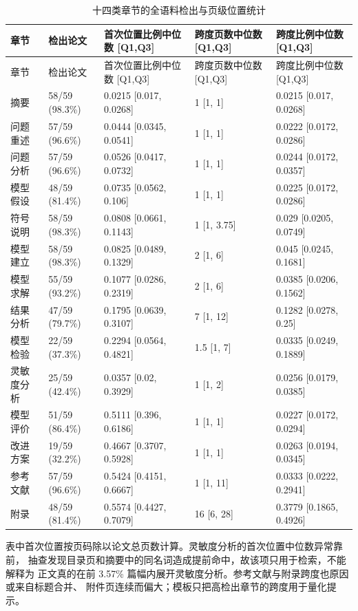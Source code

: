 \begin{longtable}{p{1.8cm}p{2.5cm}p{3.0cm}p{2.8cm}p{3.0cm}}
\caption{十四类章节的全语料检出与页级位置统计}\label{tab:section-stats}\\
\toprule
章节 & 检出论文 & 首次位置比例中位数 [Q1,Q3] & 跨度页数中位数 [Q1,Q3] & 跨度比例中位数 [Q1,Q3]\\
\midrule
\endfirsthead
\toprule
章节 & 检出论文 & 首次位置比例中位数 [Q1,Q3] & 跨度页数中位数 [Q1,Q3] & 跨度比例中位数 [Q1,Q3]\\
\midrule
\endhead
摘要 & 58/59 (98.3\%) & 0.0215 [0.017, 0.0268] & 1 [1, 1] & 0.0215 [0.017, 0.0268]\\
问题重述 & 57/59 (96.6\%) & 0.0444 [0.0345, 0.0541] & 1 [1, 1] & 0.0222 [0.0172, 0.0286]\\
问题分析 & 57/59 (96.6\%) & 0.0526 [0.0417, 0.0732] & 1 [1, 1] & 0.0244 [0.0172, 0.0357]\\
模型假设 & 48/59 (81.4\%) & 0.0735 [0.0562, 0.106] & 1 [1, 1] & 0.0225 [0.0172, 0.0286]\\
符号说明 & 58/59 (98.3\%) & 0.0808 [0.0661, 0.1143] & 1 [1, 3.75] & 0.029 [0.0205, 0.0749]\\
模型建立 & 58/59 (98.3\%) & 0.0825 [0.0489, 0.1329] & 2 [1, 6] & 0.045 [0.0245, 0.1681]\\
模型求解 & 55/59 (93.2\%) & 0.1077 [0.0286, 0.2319] & 2 [1, 6] & 0.0385 [0.0206, 0.1562]\\
结果分析 & 47/59 (79.7\%) & 0.1795 [0.0639, 0.3107] & 7 [1, 12] & 0.1282 [0.0278, 0.25]\\
模型检验 & 22/59 (37.3\%) & 0.2294 [0.0564, 0.4821] & 1.5 [1, 7] & 0.0335 [0.0249, 0.1889]\\
灵敏度分析 & 25/59 (42.4\%) & 0.0357 [0.02, 0.3929] & 1 [1, 2] & 0.0256 [0.0179, 0.0385]\\
模型评价 & 51/59 (86.4\%) & 0.5111 [0.396, 0.6186] & 1 [1, 1] & 0.0227 [0.0172, 0.0294]\\
改进方案 & 19/59 (32.2\%) & 0.4667 [0.3707, 0.5928] & 1 [1, 1] & 0.0263 [0.0194, 0.0345]\\
参考文献 & 57/59 (96.6\%) & 0.5424 [0.4151, 0.6667] & 1 [1, 11] & 0.0333 [0.0222, 0.2941]\\
附录 & 48/59 (81.4\%) & 0.5574 [0.4427, 0.7079] & 16 [6, 28] & 0.3779 [0.1865, 0.4926]\\
\bottomrule
\end{longtable}

表中首次位置按页码除以论文总页数计算。灵敏度分析的首次位置中位数异常靠前，
抽查发现目录页和摘要中的同名词造成提前命中，故该项只用于检索，不能解释为
正文真的在前 3.57\% 篇幅内展开灵敏度分析。参考文献与附录跨度也原因或来自标题合并、
附件页连续而偏大；模板只把高检出章节的跨度用于量化提示。

